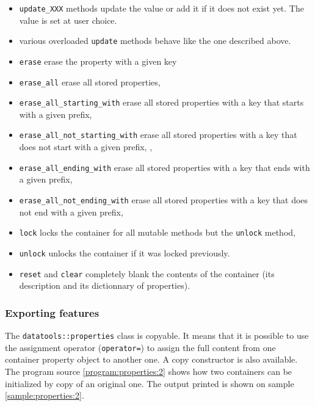 \begin{itemize}
\item \texttt{update\_XXX}  methods update the  value or add it  if it
  does not exist yet. The value is set at user choice.

\item various overloaded \texttt{update} methods behave like
the one described above.

\item \texttt{erase}  erase the property with a given key

\item \texttt{erase\_all}  erase all stored properties,

\item \texttt{erase\_all\_starting\_with}  erase all stored properties
with a key that starts with a given prefix,

\item \texttt{erase\_all\_not\_starting\_with}  erase all stored properties
with a key that does not start with a given prefix,
,

\item \texttt{erase\_all\_ending\_with}  erase all stored properties
with a key that ends with a given prefix,

\item \texttt{erase\_all\_not\_ending\_with}  erase all stored properties
with a key that does not end with a given prefix,

\item \texttt{lock}  locks the container  for all mutable  methods but
  the \texttt{unlock} method,

\item  \texttt{unlock} unlocks the container if it was locked
  previously.

\item  \texttt{reset} and \texttt{clear} completely blank the contents
of the container (its description and its dictionnary of properties).

\end{itemize}


\subsubsection{Exporting features}

The \texttt{datatools::properties} class  is copyable. It means
that it is possible to use the assignment operator (\verb+operator=+)
to assign the full content from one container property object to another one. A
copy   constructor   is    also   available.    The   program   source
\ref{program:properties:2} shows how two containers can be initialized
by copy  of an  original one.  The output printed  is shown  on sample
\ref{sample:properties:2}.


